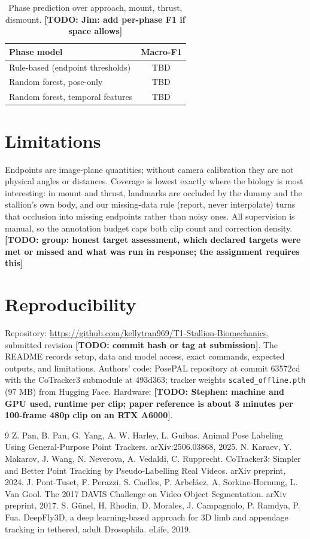 \documentclass[11pt]{article}
\newcommand{\todo}[1]{\textbf{[TODO: #1]}}
\begin{document}
\begin{table}[h]
\centering\small
\begin{tabular}{lc}
\toprule
Phase model & Macro-F1\\
\midrule
Rule-based (endpoint thresholds) & TBD\\
Random forest, pose-only & TBD\\
Random forest, temporal features & TBD\\
\bottomrule
\end{tabular}
\caption{Phase prediction over approach, mount, thrust, dismount.
\todo{Jim: add per-phase F1 if space allows}}
\end{table}

\section{Limitations}

Endpoints are image-plane quantities; without camera calibration they
are not physical angles or distances. Coverage is lowest exactly where
the biology is most interesting: in mount and thrust, landmarks are
occluded by the dummy and the stallion's own body, and our missing-data
rule (report, never interpolate) turns that occlusion into missing
endpoints rather than noisy ones. All supervision is manual, so the
annotation budget caps both clip count and correction density.
\todo{group: honest target assessment, which declared targets were met
or missed and what was run in response; the assignment requires this}

\section{Reproducibility}

Repository: \url{https://github.com/kellytran969/T1-Stallion-Biomechanics},
submitted revision \todo{commit hash or tag at submission}. The README
records setup, data and model access, exact commands, expected outputs,
and limitations. Authors' code: PosePAL repository at commit 63572cd
with the CoTracker3 submodule at 493d363; tracker weights
\texttt{scaled\_offline.pth} (97 MB) from Hugging Face. Hardware:
\todo{Stephen: machine and GPU used, runtime per clip; paper reference
is about 3 minutes per 100-frame 480p clip on an RTX A6000}.

\begin{thebibliography}{9}\small
{} Z. Pan, B. Pan, G. Yang, A. W. Harley, L. Guibas.
Animal Pose Labeling Using General-Purpose Point Trackers.
arXiv:2506.03868, 2025.
 N. Karaev, Y. Makarov, J. Wang, N. Neverova,
A. Vedaldi, C. Rupprecht. CoTracker3: Simpler and Better Point Tracking
by Pseudo-Labelling Real Videos. arXiv preprint, 2024.
 J. Pont-Tuset, F. Perazzi, S. Caelles, P. Arbel\'aez,
A. Sorkine-Hornung, L. Van Gool. The 2017 DAVIS Challenge on Video
Object Segmentation. arXiv preprint, 2017.
 S. G\"unel, H. Rhodin, D. Morales, J. Campagnolo,
P. Ramdya, P. Fua. DeepFly3D, a deep learning-based approach for 3D
limb and appendage tracking in tethered, adult Drosophila.
eLife, 2019.
\end{thebibliography}
\end{document}
